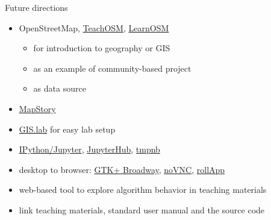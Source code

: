 \documentclass[xcolor={dvipsnames,usenames},beamer]{beamer}
\begin{document}
\begin{frame}{Future directions}

\begin{itemize}
 \item OpenStreetMap,
    \href{http://teachosm.org}{TeachOSM}, \href{http://learnosm.org}{LearnOSM}
 \begin{itemize}
  \item for introduction to geography or GIS
  \item as an example of community-based project
  \item as data source
 \end{itemize}
 \item \href{http://mapstory.org/}{MapStory}
 \item \href{http://imincik.github.io/gis-lab/}{GIS.lab} {\scriptsize for easy lab setup}
 \item \href{http://jupyter.org/}{IPython/Jupyter},
    \href{https://github.com/jupyter/jupyterhub}{JupyterHub},
    \href{https://github.com/jupyter/tmpnb}{tmpnb}
 \item
    desktop to browser:
    \href{https://developer.gnome.org/gtk3/stable/gtk-broadway.html}{GTK+ Broadway},
    \href{https://kanaka.github.io/noVNC/}{noVNC},
    \href{https://www.rollapp.com/}{rollApp}
 \item web-based tool to explore algorithm behavior in teaching materials
 \item link teaching materials, standard user manual and the source code
\end{itemize}

\end{frame}
\end{document}

